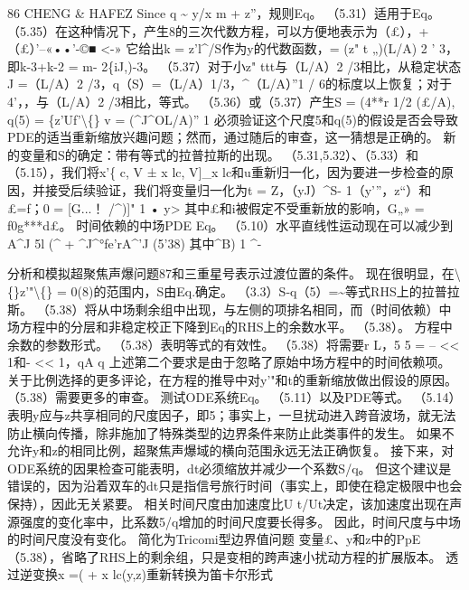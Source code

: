 \documentclass[UTF8,11pt,a4paper,openany,fontset=fandol]{ctexbook}
\begin{document}
86 CHENG \& HAFEZ Since q \textasciitilde{} y/x m + z”，规则Eq。 （5.31）适用于Eq。 （5.35）在这种情况下，产生8的三次代数方程，可以方便地表示为（£），+（£）'--«••'-©■ <-» 它给出k = z'l\textasciicircum{}/S作为y的代数函数，= (z" t „)(L/A) 2 ' 3，即k-3+k-2 = m- 2\{iJ,)-3。 （5.37）对于小z" ttt与（L/A）2 /3相比，从稳定状态J =（L/A）2 /3，q（S）=（L/A）1/3，\textasciicircum{}（L/A）”1 / 6的标度以上恢复；对于4'，，与（L/A）2 /3相比，等式。 （5.36）或（5.37）产生S = (4**r 1/2 (£/A), q(5) = \{z'Uf'\textbackslash\{\} v = (\textasciicircum{}J\textasciicircum{}OL/A)” 1 必须验证这个尺度5和q(5)的假设是否会导致PDE的适当重新缩放兴趣问题；然而，通过随后的审查，这一猜想是正确的。 新的变量和S的确定：带有等式的拉普拉斯的出现。 （5.31,5.32）、（5.33）和（5.15），我们将x'\{ c, V ± x lc, V]\_x lc和u重新归一化，因为要进一步检查的原因，并接受后续验证，我们将变量归一化为t = Z，（yJ）\textasciicircum{}S- 1（y'”，z“）和£=f；0 = [G...！ /\textasciicircum{})]" 1 • y> 其中£和i被假定不受重新放的影响，G„» = f0g***d£。 时间依赖的中场PDE Eq。 （5.10）水平直线性运动现在可以减少到A\textasciicircum{}J 5l (\textasciicircum{} + \textasciicircum{}J\textasciicircum{}°fe'rA\textasciicircum{}'J (5'38) 其中\textasciicircum{}B) 1 \textasciicircum{}-

分析和模拟超聚焦声爆问题87和三重星号表示过渡位置的条件。 现在很明显，在\textbackslash\{\}z'"\textbackslash\{\} = 0(8)的范围内，S由Eq.确定。 （3.3）S-q（5）=\textasciitilde{}等式RHS上的拉普拉斯。 （5.38）将从中场剩余组中出现，与左侧的项排名相同，而（时间依赖）中场方程中的分层和非稳定校正下降到Eq的RHS上的余数水平。 （5.38）。 方程中余数的参数形式。 （5.38）表明等式的有效性。 （5.38）将需要r L，5 5 = -- << 1和- << 1，qA q 上述第二个要求是由于忽略了原始中场方程中的时间依赖项。 关于比例选择的更多评论，在方程的推导中对y'"和t的重新缩放做出假设的原因。 （5.38）需要更多的审查。 测试ODE系统Eq。 （5.11）以及PDE等式。 （5.14）表明y应与z共享相同的尺度因子，即5；事实上，一旦扰动进入跨音波场，就无法防止横向传播，除非施加了特殊类型的边界条件来防止此类事件的发生。 如果不允许y和z的相同比例，超聚焦声爆域的横向范围永远无法正确恢复。 接下来，对ODE系统的因果检查可能表明，dt必须缩放并减少一个系数S/q。 但这个建议是错误的，因为沿着双车的dt只是指信号旅行时间（事实上，即使在稳定极限中也会保持），因此无关紧要。 相关时间尺度由加速度比U t/Ut决定，该加速度出现在声源强度的变化率中，比系数5/q增加的时间尺度要长得多。 因此，时间尺度与中场的时间尺度没有变化。 简化为Tricomi型边界值问题 变量£、y和z中的PpE（5.38），省略了RHS上的剩余组，只是变相的跨声速小扰动方程的扩展版本。 透过逆变换x =( + x lc(y,z)重新转换为笛卡尔形式
\end{document}

